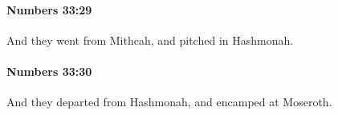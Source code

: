 		\paragraph{Numbers 33:29} %
			\label{NUMBERS-33-29}

			And they went from Mithcah, and pitched in Hashmonah.


		\paragraph{Numbers 33:30} %
			\label{NUMBERS-33-30}

			And they departed from Hashmonah, and encamped at Moseroth.


